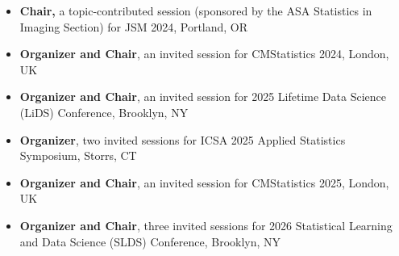 \documentclass[12pt,letterpaper]{article}
\newenvironment{cventry}{\begin{minipage}[t]{\linewidth}}{\end{minipage}}
\begin{document}
\begin{itemize}
\begin{cventry} {\bf Organizer and Chair,}
		ICSA 2024 Applied Statistics Symposium, Nashville, TN
		\par\end{cventry}
		\item\begin{cventry} {\bf Chair,} a topic-contributed session 
		(sponsored by the ASA Statistics in Imaging Section) for JSM 
		2024, Portland, OR
		\par\end{cventry}
		\item\begin{cventry} {\bf Organizer and Chair}, an invited session for 
		CMStatistics 2024, London, UK
		\par\end{cventry}
		\item\begin{cventry} {\bf Organizer and Chair}, an invited session for 2025 
		Lifetime Data Science (LiDS) Conference, Brooklyn, NY
		\par\end{cventry}
		\item\begin{cventry} {\bf Organizer}, two invited sessions for ICSA 2025 
		Applied Statistics Symposium, Storrs, CT
		\par\end{cventry}
		\item\begin{cventry} {\bf Organizer and Chair}, an invited session for 
		CMStatistics 2025, London, UK
		\par\end{cventry}
		\item\begin{cventry} {\bf Organizer and Chair}, three invited sessions for 
		2026 Statistical Learning and Data Science (SLDS) Conference,
		Brooklyn, NY
		\par\end{cventry}
	\end{itemize}
	
	
\end{document}
